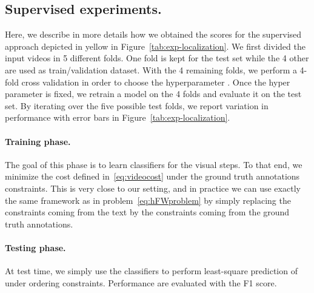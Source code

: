 \documentclass[10pt,twocolumn,letterpaper]{article}
\begin{document}
\subsection{Supervised experiments.} 
Here, we describe in more details how we obtained the scores for the supervised approach depicted in yellow in Figure~\ref{tab:exp-localization}.
We first divided the  input videos in 5 different folds.
One fold is kept for the test set while the 4 other are used as train/validation dataset.
With the 4 remaining folds, we perform a 4-fold cross validation in order to choose the hyperparameter .
Once the hyper parameter is fixed, we retrain a model on the 4 folds and evaluate it on the test set.
By iterating over the five possible test folds, we report variation in performance with error bars in Figure~\ref{tab:exp-localization}.

\paragraph{Training phase.}
The goal of this phase is to learn classifiers  for the visual steps.
To that end, we minimize the cost defined in~\eqref{eq:videocost} under the ground truth annotations constraints.
This is very close to our setting, and in practice we can use exactly the same framework as in problem~\eqref{eq:hFWproblem} by simply replacing the constraints coming from the text by the constraints coming from the ground truth annotations.
\paragraph{Testing phase.}
At test time, we simply use the classifiers  to perform least-square prediction of  under ordering constraints.
Performance are evaluated with the F1 score.
\end{document}
